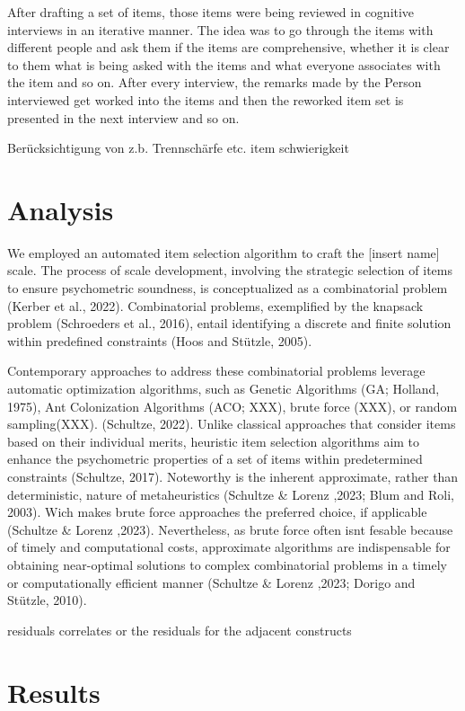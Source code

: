 \documentclass[
  12pt,
  a4paper,
  twoside]{article}
\begin{document}
After drafting a set of items, those items were being reviewed in cognitive interviews in an iterative manner. The idea was to go through the items with different people and ask them if the items are comprehensive, whether it is clear to them what is being asked with the items and what everyone associates with the item and so on. After every interview, the remarks made by the Person interviewed get worked into the items and then the reworked item set is presented in the next interview and so on.

Berücksichtigung von z.b. Trennschärfe etc. item schwierigkeit

\hypertarget{analysis}{%
\section{Analysis}\label{analysis}}

We employed an automated item selection algorithm to craft the {[}insert name{]} scale. The process of scale development, involving the strategic selection of items to ensure psychometric soundness, is conceptualized as a combinatorial problem (Kerber et al., 2022). Combinatorial problems, exemplified by the knapsack problem (Schroeders et al., 2016), entail identifying a discrete and finite solution within predefined constraints (Hoos and Stützle, 2005).

Contemporary approaches to address these combinatorial problems leverage automatic optimization algorithms, such as Genetic Algorithms (GA; Holland, 1975), Ant Colonization Algorithms (ACO; XXX), brute force (XXX), or random sampling(XXX). (Schultze, 2022).
Unlike classical approaches that consider items based on their individual merits, heuristic item selection algorithms aim to enhance the psychometric properties of a set of items within predetermined constraints (Schultze, 2017).
Noteworthy is the inherent approximate, rather than deterministic, nature of metaheuristics (Schultze \& Lorenz ,2023; Blum and Roli, 2003). Wich makes brute force approaches the preferred choice, if applicable (Schultze \& Lorenz ,2023). Nevertheless, as brute force often isnt fesable because of timely and computational costs, approximate algorithms are indispensable for obtaining near-optimal solutions to complex combinatorial problems in a timely or computationally efficient manner (Schultze \& Lorenz ,2023; Dorigo and Stützle, 2010).

residuals
correlates or the residuals for the adjacent constructs

\hypertarget{results}{%
\section{Results}\label{results}}
\end{document}

